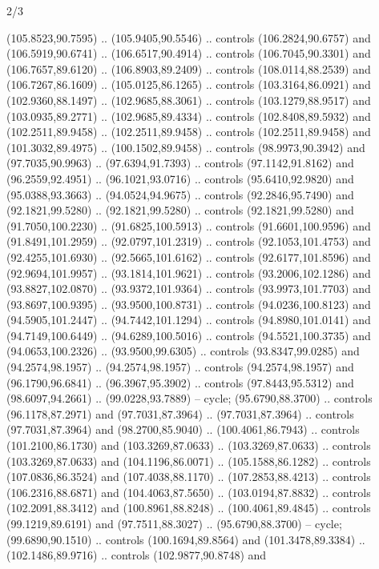 \begin{flagdescription}{2/3}
\begin{scope}[scale=0.00214\flagwidth,yshift=164.5mm]
\begin{scope}[y=-0.8pt, x=0.8pt, inner sep=0pt, outer sep=0pt]
\begin{scope}[draw=black,fill=dark,line width=0.162pt]
  (105.8523,90.7595) .. (105.9405,90.5546) .. controls (106.2824,90.6757) and
  (106.5919,90.6741) .. (106.6517,90.4914) .. controls (106.7045,90.3301) and
  (106.7657,89.6120) .. (106.8903,89.2409) .. controls (108.0114,88.2539) and
  (106.7267,86.1609) .. (105.0125,86.1265) .. controls (103.3164,86.0921) and
  (102.9360,88.1497) .. (102.9685,88.3061) .. controls (103.1279,88.9517) and
  (103.0935,89.2771) .. (102.9685,89.4334) .. controls (102.8408,89.5932) and
  (102.2511,89.9458) .. (102.2511,89.9458) .. controls (102.2511,89.9458) and
  (101.3032,89.4975) .. (100.1502,89.9458) .. controls (98.9973,90.3942) and
  (97.7035,90.9963) .. (97.6394,91.7393) .. controls (97.1142,91.8162) and
  (96.2559,92.4951) .. (96.1021,93.0716) .. controls (95.6410,92.9820) and
  (95.0388,93.3663) .. (94.0524,94.9675) .. controls (92.2846,95.7490) and
  (92.1821,99.5280) .. (92.1821,99.5280) .. controls (92.1821,99.5280) and
  (91.7050,100.2230) .. (91.6825,100.5913) .. controls (91.6601,100.9596) and
  (91.8491,101.2959) .. (92.0797,101.2319) .. controls (92.1053,101.4753) and
  (92.4255,101.6930) .. (92.5665,101.6162) .. controls (92.6177,101.8596) and
  (92.9694,101.9957) .. (93.1814,101.9621) .. controls (93.2006,102.1286) and
  (93.8827,102.0870) .. (93.9372,101.9364) .. controls (93.9973,101.7703) and
  (93.8697,100.9395) .. (93.9500,100.8731) .. controls (94.0236,100.8123) and
  (94.5905,101.2447) .. (94.7442,101.1294) .. controls (94.8980,101.0141) and
  (94.7149,100.6449) .. (94.6289,100.5016) .. controls (94.5521,100.3735) and
  (94.0653,100.2326) .. (93.9500,99.6305) .. controls (93.8347,99.0285) and
  (94.2574,98.1957) .. (94.2574,98.1957) .. controls (94.2574,98.1957) and
  (96.1790,96.6841) .. (96.3967,95.3902) .. controls (97.8443,95.5312) and
  (98.6097,94.2661) .. (99.0228,93.7889) -- cycle;
 (95.6790,88.3700) .. controls (96.1178,87.2971) and
  (97.7031,87.3964) .. (97.7031,87.3964) .. controls (97.7031,87.3964) and
  (98.2700,85.9040) .. (100.4061,86.7943) .. controls (101.2100,86.1730) and
  (103.3269,87.0633) .. (103.3269,87.0633) .. controls (103.3269,87.0633) and
  (104.1196,86.0071) .. (105.1588,86.1282) .. controls (107.0836,86.3524) and
  (107.4038,88.1170) .. (107.2853,88.4213) .. controls (106.2316,88.6871) and
  (104.4063,87.5650) .. (103.0194,87.8832) .. controls (102.2091,88.3412) and
  (100.8961,88.8248) .. (100.4061,89.4845) .. controls (99.1219,89.6191) and
  (97.7511,88.3027) .. (95.6790,88.3700) -- cycle;
 (99.6890,90.1510) .. controls (100.1694,89.8564) and
  (101.3478,89.3384) .. (102.1486,89.9716) .. controls (102.9877,90.8748) and

\end{scope}
\end{scope}
\end{scope}
\end{flagdescription}
